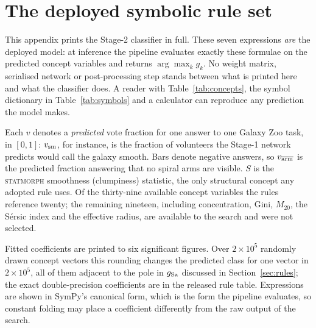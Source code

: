 \documentclass[11pt]{article}
\begin{document}
\clearpage
\appendix
\section{The deployed symbolic rule set}
\label{app:rules}

This appendix prints the Stage-2 classifier in full. These seven expressions
\emph{are} the deployed model: at inference the pipeline evaluates exactly
these formulae on the predicted concept variables and returns
$\arg\max_k g_k$. No weight matrix, serialised network or post-processing step
stands between what is printed here and what the classifier does. A reader
with Table~\ref{tab:concepts}, the symbol dictionary in
Table~\ref{tab:symbols} and a calculator can reproduce any prediction the
model makes.

Each $v$ denotes a \emph{predicted} vote fraction for one answer to one Galaxy
Zoo task, in $[0,1]$: $v_{\rm sm}$, for instance, is the fraction of
volunteers the Stage-1 network predicts would call the galaxy smooth. Bars
denote negative answers, so $v_{\overline{\rm arm}}$ is the predicted fraction
answering that no spiral arms are visible. $S$ is the \textsc{statmorph}
smoothness (clumpiness) statistic, the only structural concept any adopted
rule uses. Of the thirty-nine available concept variables the rules reference
twenty; the remaining nineteen, including concentration, Gini, $M_{20}$, the
S\'ersic index and the effective radius, are available to the search and were
not selected.

\begin{table}[htbp]
\centering
\caption{Symbol dictionary for Equations~\eqref{eq:rule_E}--\eqref{eq:rule_Irr},
grouped by Galaxy
Zoo decision-tree task. Column two gives the corresponding column name in the
released concept table.}
\label{tab:symbols}
\small
\setlength{\tabcolsep}{5pt}

\end{table}

Fitted coefficients are printed to six significant figures. Over
$2\times10^{5}$ randomly drawn concept vectors this rounding changes the
predicted class for one vector in $2\times10^{5}$, all of them adjacent to the
pole in $g_{\rm Sa}$ discussed in Section~\ref{sec:rules}; the exact
double-precision coefficients are in the released rule table. Expressions are
shown in SymPy's canonical form, which is the form the pipeline evaluates, so
constant folding may place a coefficient differently from the raw output of
the search.
\end{document}
